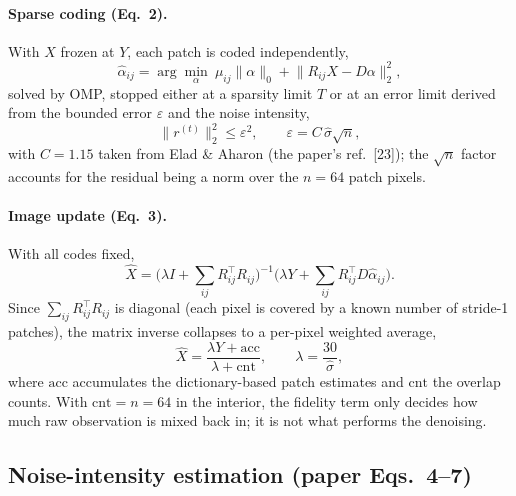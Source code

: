 \documentclass[11pt,a4paper]{article}
\newcommand{\Xh}{\hat{X}}
\newcommand{\ah}{\hat{\alpha}}
\newcommand{\sh}{\hat{\sigma}}
\newcommand{\Rij}{R_{ij}}
\newcommand{\norm}[1]{\lVert #1\rVert}
\begin{document}
\paragraph{Sparse coding (Eq.~2).} With $X$ frozen at $Y$, each patch is coded independently,
\begin{equation}
\ah_{ij}=\arg\min_{\alpha}\ \mu_{ij}\norm{\alpha}_0+\norm{\Rij X-D\alpha}_2^2 ,
\label{eq:omp}
\end{equation}
solved by OMP, stopped either at a sparsity limit $T$ or at an error limit derived from the bounded error
$\varepsilon$ and the noise intensity,
\begin{equation}
\norm{r^{(t)}}_2^2\le\varepsilon^2,\qquad \varepsilon=C\,\sh\sqrt{n},
\label{eq:eps}
\end{equation}
with $C=1.15$ taken from Elad \& Aharon (the paper's ref.~[23]); the $\sqrt{n}$ factor accounts for the residual
being a norm over the $n=64$ patch pixels.

\paragraph{Image update (Eq.~3).} With all codes fixed,
\begin{equation}
\Xh=\Big(\lambda I+\sum_{ij}\Rij^{\top}\Rij\Big)^{-1}\Big(\lambda Y+\sum_{ij}\Rij^{\top}D\ah_{ij}\Big).
\label{eq:update}
\end{equation}
Since $\sum_{ij}\Rij^\top\Rij$ is diagonal (each pixel is covered by a known number of stride-1 patches), the matrix
inverse collapses to a per-pixel weighted average,
\begin{equation}
\Xh=\frac{\lambda Y+\mathrm{acc}}{\lambda+\mathrm{cnt}},\qquad \lambda=\frac{30}{\sh},
\label{eq:updateclosed}
\end{equation}
where $\mathrm{acc}$ accumulates the dictionary-based patch estimates and $\mathrm{cnt}$ the overlap counts. With
$\mathrm{cnt}=n=64$ in the interior, the fidelity term only decides how much raw observation is mixed back in; it
is not what performs the denoising.

\subsection{Noise-intensity estimation (paper Eqs.\ 4--7)}
\end{document}
